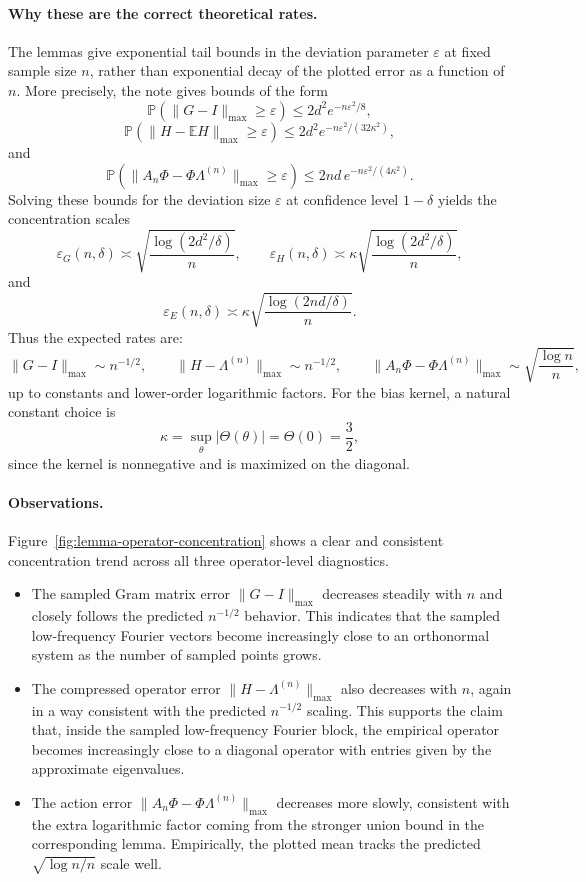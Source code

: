 \documentclass[11pt]{article}
\begin{document}
\paragraph{Why these are the correct theoretical rates.}
The lemmas give exponential tail bounds in the deviation parameter $\varepsilon$ at fixed sample size $n$, rather than exponential decay of the plotted error as a function of $n$. More precisely, the note gives bounds of the form
\[
	\mathbb{P}\!\left(\|G-I\|_{\max}\geq \varepsilon\right)
	\leq
	2d^2 e^{-n\varepsilon^2/8},
\]
\[
	\mathbb{P}\!\left(\|H-\mathbb{E}H\|_{\max}\geq \varepsilon\right)
	\leq
	2d^2 e^{-n\varepsilon^2/(32\kappa^2)},
\]
and
\[
	\mathbb{P}\!\left(\|A_n\Phi-\Phi\Lambda^{(n)}\|_{\max}\geq \varepsilon\right)
	\leq
	2nd\, e^{-n\varepsilon^2/(4\kappa^2)}.
\]
Solving these bounds for the deviation size $\varepsilon$ at confidence level $1-\delta$ yields the concentration scales
\[
	\varepsilon_G(n,\delta)\asymp
	\sqrt{\frac{\log(2d^2/\delta)}{n}},
	\qquad
	\varepsilon_H(n,\delta)\asymp
	\kappa \sqrt{\frac{\log(2d^2/\delta)}{n}},
\]
and
\[
	\varepsilon_E(n,\delta)\asymp
	\kappa \sqrt{\frac{\log(2nd/\delta)}{n}}.
\]
Thus the expected rates are:
\[
	\|G-I\|_{\max} \sim n^{-1/2},
	\qquad
	\|H-\Lambda^{(n)}\|_{\max} \sim n^{-1/2},
	\qquad
	\|A_n\Phi-\Phi\Lambda^{(n)}\|_{\max} \sim \sqrt{\frac{\log n}{n}},
\]
up to constants and lower-order logarithmic factors. For the bias kernel, a natural constant choice is
\[
	\kappa=\sup_{\theta}|\Theta(\theta)|=\Theta(0)=\frac{3}{2},
\]
since the kernel is nonnegative and is maximized on the diagonal.

\paragraph{Observations.}
Figure~\ref{fig:lemma-operator-concentration} shows a clear and consistent concentration trend across all three operator-level diagnostics.

\begin{itemize}
	\item The sampled Gram matrix error $\|G-I\|_{\max}$ decreases steadily with $n$ and closely follows the predicted $n^{-1/2}$ behavior. This indicates that the sampled low-frequency Fourier vectors become increasingly close to an orthonormal system as the number of sampled points grows.

	\item The compressed operator error $\|H-\Lambda^{(n)}\|_{\max}$ also decreases with $n$, again in a way consistent with the predicted $n^{-1/2}$ scaling. This supports the claim that, inside the sampled low-frequency Fourier block, the empirical operator becomes increasingly close to a diagonal operator with entries given by the approximate eigenvalues.

	\item The action error $\|A_n\Phi-\Phi\Lambda^{(n)}\|_{\max}$ decreases more slowly, consistent with the extra logarithmic factor coming from the stronger union bound in the corresponding lemma. Empirically, the plotted mean tracks the predicted $\sqrt{\log n / n}$ scale well.
\end{itemize}
\end{document}
